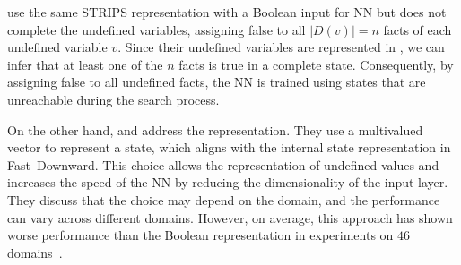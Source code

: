 \citet{yu2020learning} use the same STRIPS representation with a Boolean input for NN but does not complete the undefined variables, assigning false to all $|D(v)|=n$ facts of each undefined variable $v$. Since their undefined variables are represented in \sas, we can infer that at least one of the $n$ facts is true in a complete state. Consequently, by assigning false to all undefined facts, the NN is trained using states that are unreachable during the search process.

On the other hand, \citet{yu2020learning} and \citet{geissmann2015learning} address the \sas representation. They use a multivalued vector to represent a state, which aligns with the internal state representation in Fast~Downward. This choice allows the representation of undefined values and increases the speed of the NN by reducing the dimensionality of the input layer. They discuss that the choice may depend on the domain, and the performance can vary across different domains. However, on average, this approach has shown worse performance than the Boolean representation in experiments on $46$ domains~\cite{yu2020learning}.
